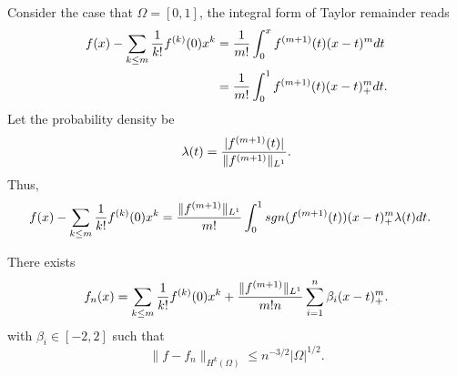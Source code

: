 Consider the case that $\Omega=[0,1]$, the integral form of Taylor remainder reads
\begin{equation}
\begin{aligned}
f(x) - \sum_{k\le m}{1\over k!}f^{(k)}(0) x^k &={1\over m!}\int_0^x f^{(m+1)}(t)(x-t)^mdt
\\
&={1\over m!}\int_0^1 f^{(m+1)}(t)(x-t)_+^mdt.
\end{aligned}
\end{equation}
Let the probability density be
\begin{equation}
\lambda(t)= {|f^{(m+1)}(t)|\over \|f^{(m+1)}\|_{L^1}}.
\end{equation}
Thus,
\begin{equation}
\begin{aligned}
f(x) - \sum_{k\le m}{1\over k!}f^{(k)}(0) x^k &={ \|f^{(m+1)}\|_{L^1}\over m!}\int_0^1 sgn(f^{(m+1)}(t))(x-t)_+^m\lambda(t)dt.
\end{aligned}
\end{equation}
\begin{lemma}
	 There exists 
	 \begin{equation}
\begin{aligned}
f_n(x) = \sum_{k\le m}{1\over k!}f^{(k)}(0) x^k + { \|f^{(m+1)}\|_{L^1}\over m!n}\sum_{i=1}^n\beta_i  (x-t)_+^m.
\end{aligned}
\end{equation}
with $\beta_i\in [-2,2]$
 such that
	\begin{equation} 
	\|f-f_n\|_{H^k(\Omega)} \leq n^{-3/2}|\Omega|^{1/2}.
	\end{equation}  
	\end{lemma}


